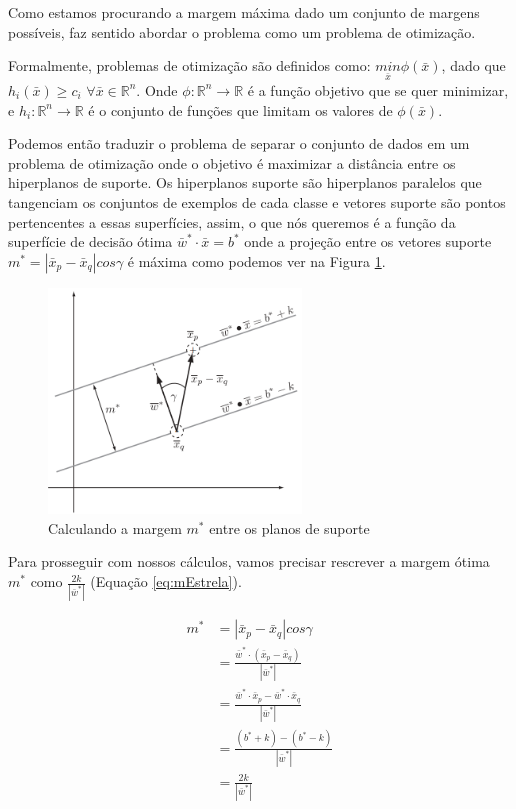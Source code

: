 Como estamos procurando a margem máxima dado um conjunto de margens possíveis, faz sentido abordar o problema como um problema de otimização.

Formalmente, problemas de otimização são definidos como: $\underset{\bar{x}}{min}\phi(\bar{x})$, dado que $h_i(\bar{x})\ge c_i$ $\forall \bar{x} \in \mathbb{R}^n$. Onde $\phi: \mathbb{R}^n\rightarrow \mathbb{R}$ é a função objetivo que se quer minimizar, e $h_i:\mathbb{R}^n\rightarrow\mathbb{R}$ é o conjunto de funções que limitam os valores de $\phi(\bar{x})$.

Podemos então traduzir o problema de separar o conjunto de dados em um problema de otimização onde o objetivo é maximizar a distância entre os hiperplanos de suporte. Os hiperplanos suporte são hiperplanos paralelos que tangenciam os conjuntos de exemplos de cada classe e vetores suporte são pontos pertencentes a essas superfícies, assim, o que nós queremos é a função da superfície de decisão ótima $\bar{w}^*\cdot\bar{x}=b^*$ onde a projeção entre os vetores suporte $m^*=|\bar{x}_p - \bar{x}_q|cos\gamma$ é máxima como podemos ver na Figura \ref{fig:LABEL_FIG_4}. 

\begin{figure}
  \centering
  \includegraphics[width=0.6\textwidth]{imagens/svm_4.png}
  \caption{Calculando a margem $m^*$ entre os planos de suporte\cite{art:LIVRO_SVM}}
  \label{fig:LABEL_FIG_4}
\end{figure}

Para prosseguir com nossos cálculos, vamos precisar rescrever a margem ótima $m^*$ como $\frac{2k}{|\bar{w}^*|}$ (Equação \ref{eq:mEstrela}).

\begin{equation} \label{eq:mEstrela}
\begin{split}
m^* &= |\bar{x}_p-\bar{x}_q|cos\gamma\\
    &= \frac{\bar{w}^*\cdot(\bar{x}_p-\bar{x}_q)}{|\bar{w}^*|}\\
    &= \frac{\bar{w}^*\cdot\bar{x}_p-\bar{w}^*\cdot\bar{x}_q}{|\bar{w}^*|}\\
    &= \frac{(b^*+k)-(b^*-k)}{|\bar{w}^*|}\\
    &= \frac{2k}{|\bar{w}^*|}
\end{split}
\end{equation}

